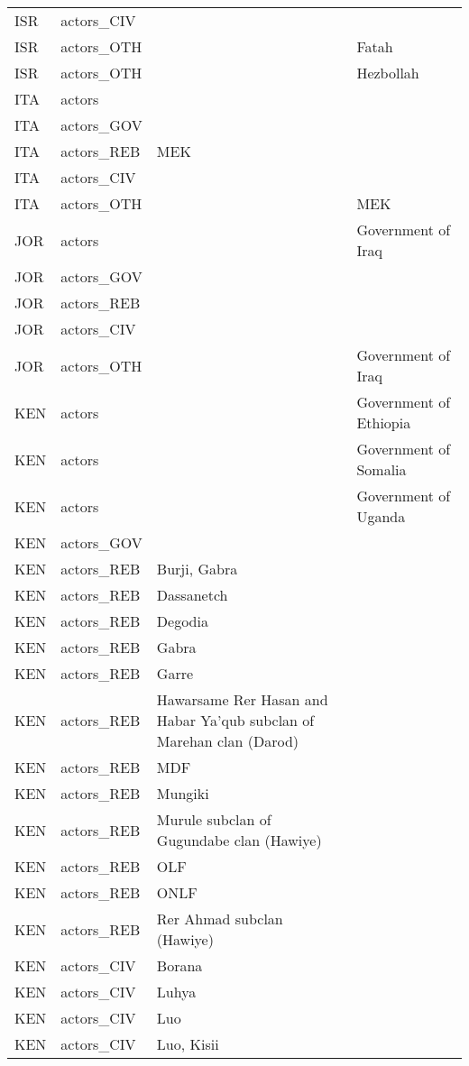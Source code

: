 \begin{table}[ht]
\begin{tabular}{llll}
  ISR & actors\_CIV &  &  \\ 
  ISR & actors\_OTH &  & Fatah \\ 
  ISR & actors\_OTH &  & Hezbollah \\ 
  ITA & actors &  &  \\ 
  ITA & actors\_GOV &  &  \\ 
  ITA & actors\_REB & MEK &  \\ 
  ITA & actors\_CIV &  &  \\ 
  ITA & actors\_OTH &  & MEK \\ 
  JOR & actors &  & Government of Iraq \\ 
  JOR & actors\_GOV &  &  \\ 
  JOR & actors\_REB &  &  \\ 
  JOR & actors\_CIV &  &  \\ 
  JOR & actors\_OTH &  & Government of Iraq \\ 
  KEN & actors &  & Government of Ethiopia \\ 
  KEN & actors &  & Government of Somalia \\ 
  KEN & actors &  & Government of Uganda \\ 
  KEN & actors\_GOV &  &  \\ 
  KEN & actors\_REB & Burji, Gabra &  \\ 
  KEN & actors\_REB & Dassanetch &  \\ 
  KEN & actors\_REB & Degodia &  \\ 
  KEN & actors\_REB & Gabra &  \\ 
  KEN & actors\_REB & Garre &  \\ 
  KEN & actors\_REB & Hawarsame Rer Hasan and Habar Ya'qub subclan of Marehan clan (Darod) &  \\ 
  KEN & actors\_REB & MDF &  \\ 
  KEN & actors\_REB & Mungiki &  \\ 
  KEN & actors\_REB & Murule subclan of Gugundabe clan (Hawiye) &  \\ 
  KEN & actors\_REB & OLF &  \\ 
  KEN & actors\_REB & ONLF &  \\ 
  KEN & actors\_REB & Rer Ahmad subclan (Hawiye) &  \\ 
  KEN & actors\_CIV & Borana &  \\ 
  KEN & actors\_CIV & Luhya &  \\ 
  KEN & actors\_CIV & Luo &  \\ 
  KEN & actors\_CIV & Luo, Kisii &  \\ 

\end{tabular}
\end{table}
